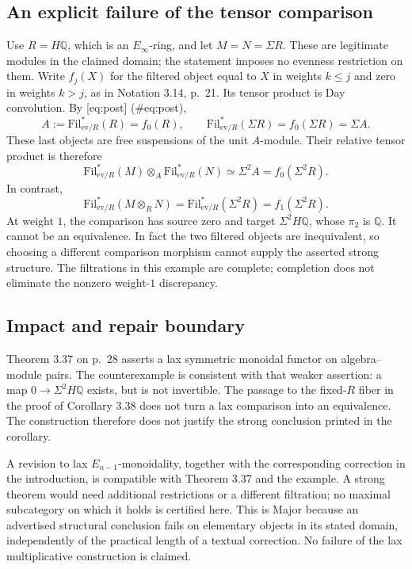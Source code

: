 \documentclass[10pt]{article}
\begin{document}
\subsection*{An explicit failure of the tensor comparison}
Use \(R=H\mathbb Q\), which is an \(E_\infty\)-ring, and let \(M=N=\Sigma R\). These are legitimate modules in the claimed domain; the statement imposes no evenness restriction on them. Write \(f_j(X)\) for the filtered object equal to \(X\) in weights \(k\le j\) and zero in weights \(k>j\), as in Notation 3.14, p. 21. Its tensor product is Day convolution. By [eq:post] (\#eq:post), \[A:=\mathrm{Fil}_{\mathrm{ev}/R}^{*}(R)=f_0(R),\qquad
 \mathrm{Fil}_{\mathrm{ev}/R}^{*}(\Sigma R)=f_0(\Sigma R)=\Sigma A .\] These last objects are free suspensions of the unit \(A\)-module. Their relative tensor product is therefore \[\mathrm{Fil}_{\mathrm{ev}/R}^{*}(M)\otimes_A\mathrm{Fil}_{\mathrm{ev}/R}^{*}(N)
 \simeq \Sigma^2 A=f_0(\Sigma^2R).\] In contrast, \[\mathrm{Fil}_{\mathrm{ev}/R}^{*}(M\otimes_R N)
 =\mathrm{Fil}_{\mathrm{ev}/R}^{*}(\Sigma^2R)=f_1(\Sigma^2R).\] At weight \(1\), the comparison has source zero and target \(\Sigma^2H\mathbb Q\), whose \(\pi_2\) is \(\mathbb Q\). It cannot be an equivalence. In fact the two filtered objects are inequivalent, so choosing a different comparison morphism cannot supply the asserted strong structure. The filtrations in this example are complete; completion does not eliminate the nonzero weight-\(1\) discrepancy.\par
\subsection*{Impact and repair boundary}
Theorem 3.37 on p. 28 asserts a lax symmetric monoidal functor on algebra–module pairs. The counterexample is consistent with that weaker assertion: a map \(0\to\Sigma^2H\mathbb Q\) exists, but is not invertible. The passage to the fixed-\(R\) fiber in the proof of Corollary 3.38 does not turn a lax comparison into an equivalence. The construction therefore does not justify the strong conclusion printed in the corollary.\par
A revision to lax \(E_{n-1}\)-monoidality, together with the corresponding correction in the introduction, is compatible with Theorem 3.37 and the example. A strong theorem would need additional restrictions or a different filtration; no maximal subcategory on which it holds is certified here. This is Major because an advertised structural conclusion fails on elementary objects in its stated domain, independently of the practical length of a textual correction. No failure of the lax multiplicative construction is claimed.\par
\end{document}
